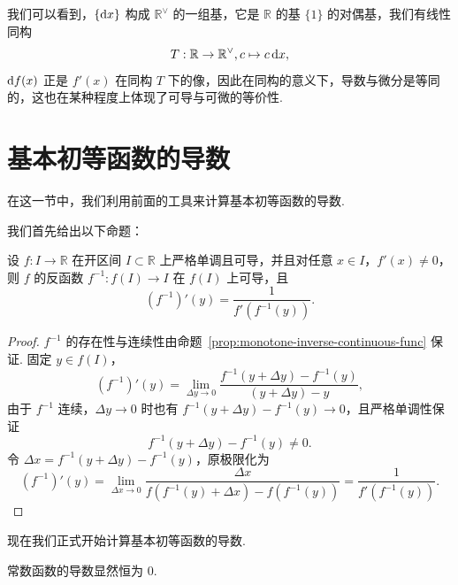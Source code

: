\documentclass[../main.tex]{subfiles}
\begin{document}
我们可以看到，$\{\mathrm{d} x\}$ 构成 $\mathbb R^\vee$ 的一组基，它是 $\mathbb R$ 的基 $\{1\}$ 的对偶基，我们有线性同构 
$$
T:\mathbb R \to \mathbb R^\vee, c \mapsto c\, \mathrm{d} x, 
$$
$\mathrm{d} f(x)$ 正是 $f'(x)$ 在同构 $T$ 下的像，因此在同构的意义下，导数与微分是等同的，这也在某种程度上体现了可导与可微的等价性. 



\section{基本初等函数的导数}

在这一节中，我们利用前面的工具来计算基本初等函数的导数. 

我们首先给出以下命题：

\begin{proposition} \label{prop:monotone-inverse-func-derivative}
    设 $f:I \to \mathbb R$ 在开区间 $I \subset \mathbb R$ 上严格单调且可导，并且对任意 $x \in I$，$f'(x) \neq 0$，则 $f$ 的反函数 $f^{-1}:f(I) \to I$ 在 $f(I)$ 上可导，且 
    $$
    (f^{-1})'(y) = \frac{1}{f'(f^{-1}(y))}. 
    $$
\end{proposition}

\begin{proof}
    $f^{-1}$ 的存在性与连续性由命题~\ref{prop:monotone-inverse-continuous-func} 保证. 固定 $y \in f(I)$，
    $$
    (f^{-1})'(y) = \lim_{\Delta y \to 0} \frac{f^{-1}(y + \Delta y) - f^{-1}(y)}{(y + \Delta y) - y}, 
    $$
    由于 $f^{-1}$ 连续，$\Delta y \to 0$ 时也有 $f^{-1}(y + \Delta y) - f^{-1}(y) \to 0$，且严格单调性保证 
    $$
    f^{-1}(y + \Delta y) - f^{-1}(y) \neq 0. 
    $$
    令 $\Delta x = f^{-1}(y + \Delta y) - f^{-1}(y)$，原极限化为
    \begin{equation*}
        (f^{-1})'(y) = \lim_{\Delta x \to 0} \frac{\Delta x}{f(f^{-1}(y) + \Delta x) - f(f^{-1}(y))} = \frac{1}{f'(f^{-1}(y))}. \tag*{\qedhere}
    \end{equation*}
\end{proof}

现在我们正式开始计算基本初等函数的导数. 

常数函数的导数显然恒为 0. 
\end{document}
